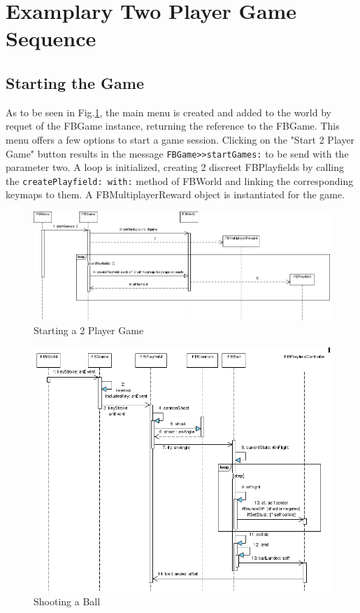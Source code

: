 \section{Examplary Two Player Game Sequence}
\subsection{Starting the Game}
As to be seen in Fig.\ref{fig:Starting2PlayerGame}, the main menu is created 
and added to the world by requet of the FBGame instance, returning the reference 
to the FBGame. This menu offers a few options to start a game session. Clicking 
on the "Start 2 Player Game" button results in the message 
\lstinline!FBGame>>startGames:! to be send with the parameter two. A loop is 
initialized, creating 2 discreet FBPlayfields by calling the 
\lstinline!createPlayfield: with:! method of FBWorld and linking the corresponding 
keymaps to them. A FBMultiplayerReward object is instantiated for the game.
%
\begin{figure}[bt]
  \begin{center}
    \includegraphics[width=\linewidth]{images/Starting2PlayerGame.png}
  \end{center}
  \caption{Starting a 2 Player Game}
  \label{fig:Starting2PlayerGame}
\end{figure}
%
%
\begin{figure}[bt]
  \begin{center}
    \includegraphics[width=\linewidth]{images/ShootingABall.png}
  \end{center}
  \caption{Shooting a Ball}
  \label{fig:ShootingABall}
\end{figure}
%

